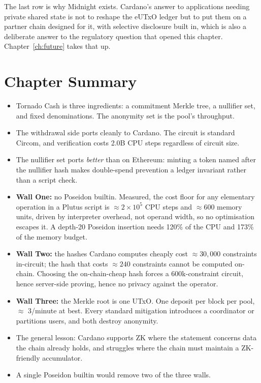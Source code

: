 The last row is why Midnight exists. Cardano's answer to applications needing
private shared state is not to reshape the eUTxO ledger but to put them on a
partner chain designed for it, with selective disclosure built in, which is
also a deliberate answer to the regulatory question that opened this chapter.
Chapter~\ref{ch:future} takes that up.

\section{Chapter Summary} \label{sec:ch8-summary}

\begin{itemize}
  \item Tornado Cash is three ingredients: a commitment Merkle tree, a nullifier
        set, and fixed denominations. The anonymity set is the pool's
        throughput.
  \item The withdrawal side ports cleanly to Cardano. The circuit is standard
        Circom, and verification costs 2.0B CPU steps regardless of circuit
        size.
  \item The nullifier set ports \emph{better} than on Ethereum: minting a token
        named after the nullifier hash makes double-spend prevention a ledger
        invariant rather than a script check.
  \item \textbf{Wall One:} no Poseidon builtin. Measured, the cost floor for any
        elementary operation in a Plutus script is $\approx 2\times10^5$ CPU
        steps and $\approx 600$ memory units, driven by interpreter overhead,
        not operand width, so no optimisation escapes it. A depth-20 Poseidon
        insertion needs 120\% of the CPU and 173\% of the memory budget.
  \item \textbf{Wall Two:} the hashes Cardano computes cheaply cost
        $\approx 30{,}000$ constraints in-circuit; the hash that costs
        $\approx 240$ constraints cannot be computed on-chain. Choosing the
        on-chain-cheap hash forces a 600k-constraint circuit, hence server-side
        proving, hence no privacy against the operator.
  \item \textbf{Wall Three:} the Merkle root is one UTxO. One deposit per block
        per pool, $\approx$ 3/minute at best. Every standard mitigation
        introduces a coordinator or partitions users, and both destroy anonymity.
  \item The general lesson: Cardano supports ZK where the statement concerns
        data the chain already holds, and struggles where the chain must
        maintain a ZK-friendly accumulator.
  \item A single Poseidon builtin would remove two of the three walls.
\end{itemize}

